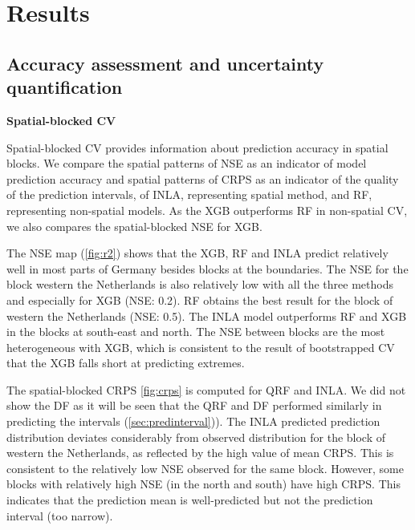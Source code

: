 \documentclass{article}
\begin{document}



\section{Results}
\subsection{Accuracy assessment and uncertainty quantification}

\noindent \textbf{Spatial-blocked CV}

Spatial-blocked CV provides information about prediction accuracy in spatial blocks. 
We compare the spatial patterns of NSE as an indicator of model prediction accuracy and spatial patterns of CRPS as an indicator of the quality of the prediction intervals, of INLA, representing spatial method, and RF, representing non-spatial models. As the XGB outperforms RF in non-spatial CV, we also compares the spatial-blocked NSE for XGB. 

The NSE map (\cref{fig:r2}) shows that the XGB, RF and INLA predict relatively well in most parts of Germany besides blocks at the boundaries. The NSE for the block western the Netherlands is also relatively low with all the three methods and especially for XGB (NSE: 0.2). RF obtains the best result for the block of western the Netherlands (NSE: 0.5). The INLA model outperforms RF and XGB in the blocks at south-east and north. The NSE between blocks are the most heterogeneous with XGB, which is consistent to the result of bootstrapped CV that the XGB falls short at predicting extremes.  

The spatial-blocked CRPS \cref{fig:crps} is computed for QRF and INLA. We did not show the DF as it will be seen that the QRF and DF performed similarly in predicting the intervals (\cref{sec:predinterval})). The INLA predicted prediction distribution deviates considerably from observed distribution for the block of western the Netherlands, as reflected by the high value of mean CRPS. This is consistent to the relatively low NSE observed for the same block. However, some blocks with relatively high NSE (in the north and south) have high CRPS. This indicates that the prediction mean is well-predicted but not the prediction interval (too narrow). 
\end{document}
